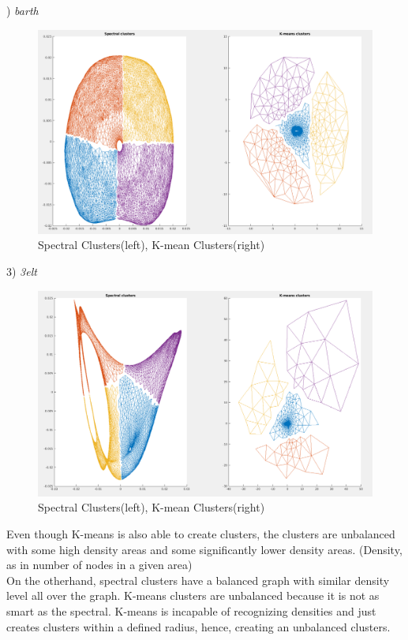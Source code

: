 \documentclass[unicode,11pt,a4paper,oneside,numbers=endperiod,openany]{scrartcl}
\begin{document}
\begin{enumerate}
) \textit{barth}
\begin{figure}[h!]
    \begin{minipage}[c]{1\linewidth}
        \centering
        \includegraphics[width=0.6\linewidth]{./figures/barthCluster.png}
    \end{minipage}
  \caption{Spectral Clusters(left), K-mean Clusters(right)}
\end{figure}

3) \textit{3elt}
\begin{figure}[h!]
    \begin{minipage}[c]{1\linewidth}
        \centering
        \includegraphics[width=0.6\linewidth]{./figures/3eltCluster.png}
    \end{minipage}
  \caption{Spectral Clusters(left), K-mean Clusters(right)}
\end{figure}

Even though K-means is also able to create clusters, the clusters are unbalanced with some high density areas and some significantly lower density areas. (Density, as in number of nodes in a given area) \\

On the otherhand, spectral clusters have a balanced graph with similar density level all over the graph. K-means clusters are unbalanced because it is not as smart as the spectral. K-means is incapable of recognizing densities and just creates clusters within a defined radius, hence, creating an unbalanced clusters.

\end{enumerate}
\end{document}
